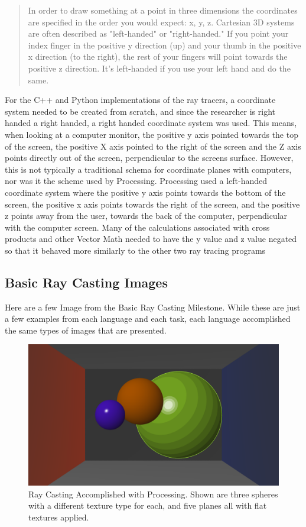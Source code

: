 \begin{quote}
In order to draw something at a point in three dimensions the coordinates are specified in the order you would expect: x, y, z. Cartesian 3D systems are often described as "left-handed" or "right-handed." If you point your index finger in the positive y direction (up) and your thumb in the positive x direction (to the right), the rest of your fingers will point towards the positive z direction. It's left-handed if you use your left hand and do the same.
\end{quote}
For the C++ and Python implementations of the ray tracers, a coordinate system needed to be created from scratch, and since the researcher is right handed a right handed, a right handed coordinate system was used.  This means, when looking at a computer monitor, the positive y axis pointed towards the top of the screen, the positive X axis pointed to the right of the screen and the Z axis points directly out of the screen, perpendicular to the screens surface.  However, this is not typically a traditional schema for coordinate planes with computers, nor was it the scheme used by Processing.  Processing used a left-handed coordinate system where the positive y axis points towards the bottom of the screen, the positive x axis points towards the right of the screen, and the positive z points away from the user, towards the back of the computer, perpendicular with the computer screen.  Many of the calculations associated with cross products and other Vector Math needed to have the y value and z value negated so that it behaved more similarly to the other two ray tracing programs
\subsection{Basic Ray Casting Images}
Here are a few Image from the Basic Ray Casting Milestone.  While these are just a few examples from each language and each task, each language accomplished the same types of images that are presented.
\begin{figure}[ht]
\centering
\includegraphics[width=\textwidth]{figures/BasicRayCastingProcessing.png}
\caption{Ray Casting Accomplished with Processing. Shown are three spheres with a different texture type for each, and five planes all with flat textures applied.}
\label{fig:processingraycasting}
\end{figure}

